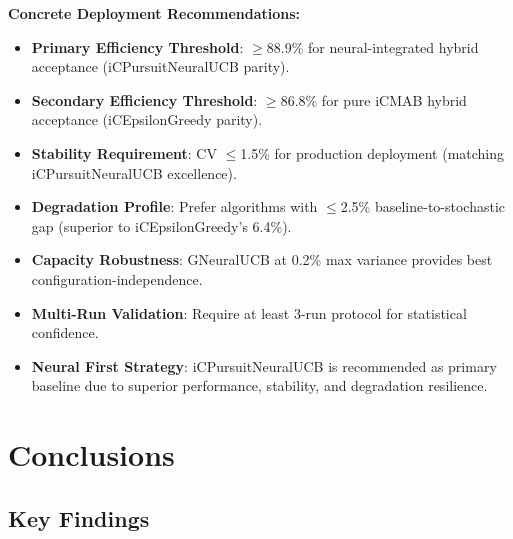 \documentclass[12pt,a4paper]{article}
\begin{document}
\textbf{Concrete Deployment Recommendations:}
\begin{itemize}
\item \textbf{Primary Efficiency Threshold}: $\geq$88.9\% for neural-integrated hybrid acceptance (iCPursuitNeuralUCB parity).
\item \textbf{Secondary Efficiency Threshold}: $\geq$86.8\% for pure iCMAB hybrid acceptance (iCEpsilonGreedy parity).
\item \textbf{Stability Requirement}: CV $\leq$1.5\% for production deployment (matching iCPursuitNeuralUCB excellence).
\item \textbf{Degradation Profile}: Prefer algorithms with $\leq$2.5\% baseline-to-stochastic gap (superior to iCEpsilonGreedy's 6.4\%).
\item \textbf{Capacity Robustness}: GNeuralUCB at 0.2\% max variance provides best configuration-independence.
\item \textbf{Multi-Run Validation}: Require at least 3-run protocol for statistical confidence.
\item \textbf{Neural First Strategy}: iCPursuitNeuralUCB is recommended as primary baseline due to superior performance, stability, and degradation resilience.
\end{itemize}

\section{Conclusions}

\subsection{Key Findings}
\end{document}
